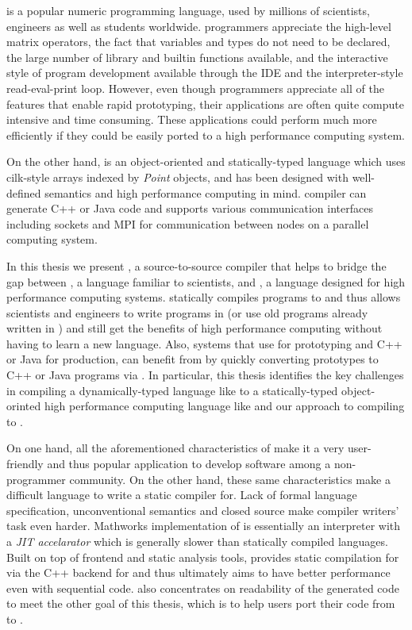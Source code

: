 \matlab is a popular numeric programming language, used by millions of
scientists, engineers as well as students worldwide\cite{MatlabGrowth}.  \matlab
programmers appreciate the high-level matrix operators,  the fact that
variables and types do not need to be declared, the large number of library and
builtin functions available, and the interactive style of program development
available through the IDE and the interpreter-style read-eval-print loop.
However, even though \matlab programmers appreciate all of the features that
enable rapid prototyping,  their applications are often quite compute intensive
and time consuming. These applications could perform much more efficiently if
they could be easily ported to a high performance computing system.  

On the other hand, \xten is an object-oriented and statically-typed language
which uses cilk-style arrays indexed by \emph{Point} objects, and has been
designed with well-defined semantics and high performance computing in mind.
\xten compiler can generate C++ or Java code and supports various communication
interfaces including sockets and MPI for communication between nodes on a
parallel computing system.

In this thesis we present \mixten, a source-to-source compiler that helps
to bridge the gap between \matlab, a language familiar to scientists,
and \xten,  a language designed for high performance computing systems. 
\mixten statically compiles \matlab programs to \xten and thus
allows scientists and engineers to write programs in \matlab (or use old 
programs already written in \matlab) and still get the benefits of high 
performance computing without having to learn a new language. Also, systems that
use \matlab for prototyping and C++ or Java for production, can benefit from
\mixten by quickly converting \matlab prototypes to C++ or Java programs via 
\xten. In particular, this thesis identifies the key challenges in compiling a
dynamically-typed language like \matlab to a statically-typed object-orinted
high performance computing language like \xten and our approach to 
compiling \matlab to \xten.
\begin{comment}
INSERT PIC
compilation flow
\end{comment}

On one hand, all the aforementioned characteristics of \matlab make it a very 
user-friendly and thus popular application to develop software among a
non-programmer community. On the other hand, these same characteristics make
\matlab a difficult language to write a static compiler for. Lack of formal 
language specification, unconventional semantics and closed source make compiler
writers' task even harder. Mathworks implementation of \matlab is essentially an
interpreter with a \emph{JIT accelarator} which is generally slower than statically
compiled languages. Built on top of \mclab frontend and static analysis tools,
 \mixten provides static compilation for \matlab via the C++
backend for \xten and thus ultimately aims to have better performance even with
sequential code. \mixten also concentrates on readability of the generated \xten
code to meet the other goal of this thesis, which is to help users port 
their code from \matlab to \xten.    

